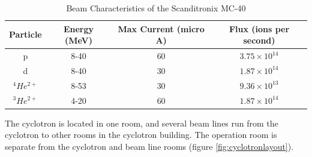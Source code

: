 \begin{table}[h]
\begin{center}
\begin{tabular}{c c c c}
\hline\hline
Particle & Energy (MeV) & Max Current (micro A) & Flux (ions per second)\\
\hline\hline
p & 8-40 & 60 & $3.75 \times 10^14$ \\
d & 8-40 & 30 & $1.87 \times 10^14$ \\
${}^4 He^{2+}$ & 8-53 & 30 & $9.36 \times 10^13$ \\
${}^3 He^{2+}$ & 4-20 & 60 & $1.87 \times 10^14$ \\
\hline\hline
\end{tabular}
\end{center}
\caption{Beam Characteristics of the Scanditronix MC-40}
\label{table:scanditronixlimits}
\end{table}

The cyclotron is located in one room, and several beam lines run from the cyclotron to other rooms in the cyclotron building.  The operation room is separate from the cyclotron and beam line rooms (figure \ref{fig:cyclotronlayout}).


